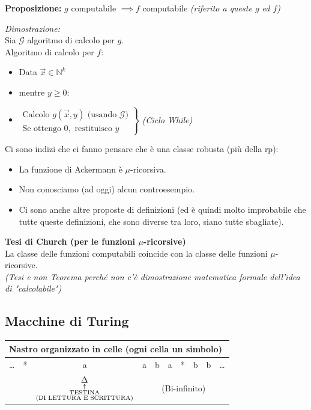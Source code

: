 \vspace{0.4cm}
\textbf{Proposizione:} $g$ computabile $\implies f$ computabile \quad \textit{(riferito a queste $g$ ed $f$)}

\textit{Dimostrazione:} \\
Sia $\mathcal{G}$ algoritmo di calcolo per $g$. \\
Algoritmo di calcolo per $f$:
\begin{itemize}
    \item Data $\vec{x} \in \mathbb{N}^k$
    \item mentre $y \ge 0$:
    \item $\left. \begin{array}{l} \text{Calcolo } g(\vec{x}, y) \text{ (usando } \mathcal{G}) \\ \text{Se ottengo } 0, \text{ restituisco } y \end{array} \right\}$ \textit{(Ciclo While)}
\end{itemize}

\vspace{0.4cm}
Ci sono indizi che ci fanno pensare che è una classe robusta (più della rp):
\begin{itemize}
    \item La funzione di Ackermann è $\mu$-ricorsiva.
    \item Non conosciamo (ad oggi) alcun controesempio.
    \item Ci sono anche altre proposte di definizioni (ed è quindi molto improbabile che tutte queste definizioni, che sono diverse tra loro, siano tutte sbagliate).
\end{itemize}
\vspace{0.6cm}
\textbf{Tesi di Church (per le funzioni $\mu$-ricorsive)} \\
La classe delle funzioni computabili coincide con la classe delle funzioni $\mu$-ricorsive. \\
\textit{(Tesi e non Teorema perché non c'è dimostrazione matematica formale dell'idea di "calcolabile")}

\vspace{0.8cm}
\subsection{Macchine di Turing}

\begin{center}
\begin{tabular}{c|c|c|c|c|c|c|c|c|c}
\multicolumn{10}{l}{\scriptsize Nastro organizzato in celle (ogni cella un simbolo)} \\
\hline
\dots & * & a & a & b & a & * & b & b & \dots \\
\hline
\multicolumn{2}{c}{} & $\underset{\substack{\uparrow \\ \text{\scriptsize TESTINA} \\ \text{\scriptsize (DI LETTURA E SCRITTURA)}}}{\Delta}$ & \multicolumn{7}{c}{\scriptsize (Bi-infinito)}
\end{tabular}
\end{center}

